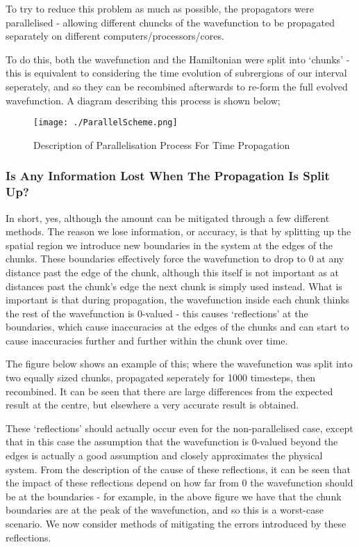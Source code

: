 To try to reduce this problem as much as possible, the propagators were parallelised - allowing different chuncks of the wavefunction to be propagated separately on different computers/processors/cores. 

To do this, both the wavefunction and the Hamiltonian were split into `chunks' - this is equivalent to considering the time evolution of subrergions of our interval seperately, and so they can be recombined afterwards to re-form the full evolved wavefunction. A diagram describing this process is shown below;

\begin{figure}[H]
         \texttt{[image: ./ParallelScheme.png]}
         \centering
         \caption{Description of Parallelisation Process For Time Propagation}
\end{figure}



\subsubsection{Is Any Information Lost When The Propagation Is Split Up?}
In short, yes, although the amount can be mitigated through a few different methods. The reason we lose information, or accuracy, is that by splitting up the spatial region we introduce new boundaries in the system at the edges of the chunks. These boundaries effectively force the wavefunction to drop to 0 at any distance past the edge of the chunk, although this itself is not important as at distances past the chunk's edge the next chunk is simply used instead. What is important is that during propagation, the wavefunction inside each chunk thinks the rest of the wavefunction is 0-valued - this causes `reflections' at the boundaries, which cause inaccuracies at the edges of the chunks and can start to cause inaccuracies further and further within the chunk over time. 

The figure below shows an example of this; where the wavefunction was split into two equally sized chunks, propagated seperately for 1000 timesteps, then recombined. It can be seen that there are large differences from the expected result at the centre, but elsewhere a very accurate result is obtained.



These `reflections' should actually occur even for the non-parallelised case, except that in this case the assumption that the wavefunction is 0-valued beyond the edges is actually a good assumption and closely approximates the physical system. From the description of the cause of these reflections, it can be seen that the impact of these reflections depend on how far from 0 the wavefunction should be at the boundaries - for example, in the above figure we have that the chunk boundaries are at the peak of the wavefunction, and so this is a worst-case scenario. We now consider methods of mitigating the errors introduced by these reflections.

